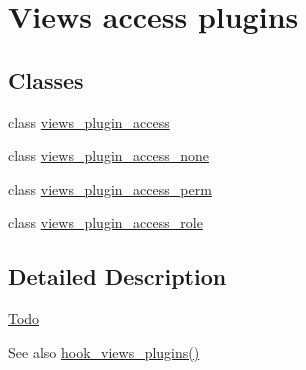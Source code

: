 \hypertarget{group__views__access__plugins}{
\section{Views access plugins}
\label{group__views__access__plugins}
}
\subsection*{Classes}
\begin{DoxyCompactItemize}
\item 
class \hyperlink{classviews__plugin__access}{views\_\-plugin\_\-access}
\item 
class \hyperlink{classviews__plugin__access__none}{views\_\-plugin\_\-access\_\-none}
\item 
class \hyperlink{classviews__plugin__access__perm}{views\_\-plugin\_\-access\_\-perm}
\item 
class \hyperlink{classviews__plugin__access__role}{views\_\-plugin\_\-access\_\-role}
\end{DoxyCompactItemize}


\subsection{Detailed Description}
\begin{Desc}
\item[\hyperlink{todo__todo000054}{Todo}]\end{Desc}
\begin{DoxySeeAlso}{See also}
\hyperlink{group__views__hooks_ga23f6e9972b2ed84fc54b7ff63f44477d}{hook\_\-views\_\-plugins()} 
\end{DoxySeeAlso}
